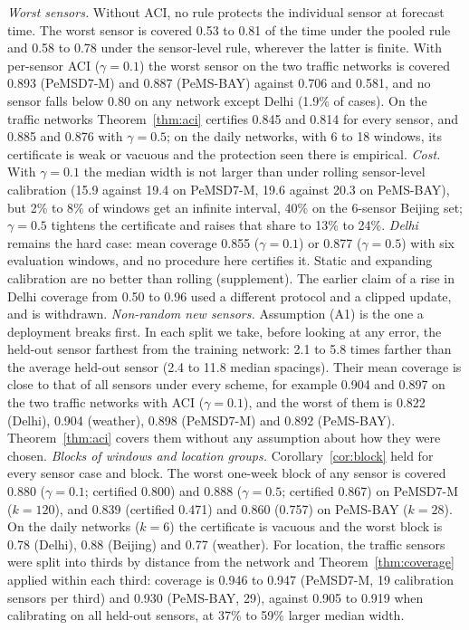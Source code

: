 \emph{Worst sensors.} Without ACI, no rule protects the individual sensor at forecast time. The worst sensor is
covered 0.53 to 0.81 of the time under the pooled rule and 0.58 to 0.78 under the sensor-level rule, wherever the
latter is finite. With per-sensor ACI ($\gamma=0.1$) the worst sensor on the two traffic networks is covered 0.893
(PeMSD7-M) and 0.887 (PeMS-BAY) against 0.706 and 0.581, and no sensor falls below 0.80 on any network except Delhi
(1.9\% of cases). On the traffic networks Theorem~\ref{thm:aci} certifies 0.845 and 0.814 for every sensor, and
0.885 and 0.876 with $\gamma=0.5$; on the daily networks, with 6 to 18 windows, its certificate is weak or vacuous
and the protection seen there is empirical.  \emph{Cost.} With $\gamma=0.1$ the median width is not larger
than under rolling sensor-level calibration (15.9 against 19.4 on PeMSD7-M, 19.6 against 20.3 on PeMS-BAY), but 2\% to 8\% of windows get an infinite interval, 40\% on the
6-sensor Beijing set; $\gamma=0.5$ tightens the certificate and raises that share to 13\% to 24\%. \emph{Delhi} remains
the hard case: mean coverage 0.855 ($\gamma=0.1$) or 0.877 ($\gamma=0.5$) with six evaluation windows, and no
procedure here certifies it. Static and expanding calibration are no better than rolling (supplement).
The earlier claim of a rise in Delhi coverage from 0.50 to 0.96 used a different protocol and a clipped update, and is withdrawn.
\emph{Non-random new sensors.} Assumption (A1) is the one a deployment breaks first. In each split we take, before
looking at any error, the held-out sensor farthest from the training network: 2.1 to 5.8 times farther than the
average held-out sensor (2.4 to 11.8 median spacings). Their mean coverage is close to that of all sensors under
every scheme, for example 0.904 and 0.897 on the two traffic networks with ACI ($\gamma=0.1$), and the worst of
them is 0.822 (Delhi), 0.904 (weather), 0.898 (PeMSD7-M) and 0.892 (PeMS-BAY). Theorem~\ref{thm:aci} covers them
without any assumption about how they were chosen.
\emph{Blocks of windows and location groups.} Corollary~\ref{cor:block} held for every sensor case and block. The worst
one-week block of any sensor is covered 0.880 ($\gamma=0.1$; certified 0.800) and 0.888 ($\gamma=0.5$; certified 0.867) on
PeMSD7-M ($k=120$), and 0.839 (certified 0.471) and 0.860 (0.757) on PeMS-BAY ($k=28$). On the daily networks ($k=6$) the certificate is vacuous and the worst block is 0.78 (Delhi), 0.88 (Beijing) and 0.77 (weather). For location, the traffic sensors were split into thirds by distance from the network and
Theorem~\ref{thm:coverage} applied within each third: coverage is 0.946 to 0.947 (PeMSD7-M, 19 calibration sensors per
third) and 0.930 (PeMS-BAY, 29), against 0.905 to 0.919 when calibrating on all held-out sensors, at 37\% to 59\% larger
median width. 

